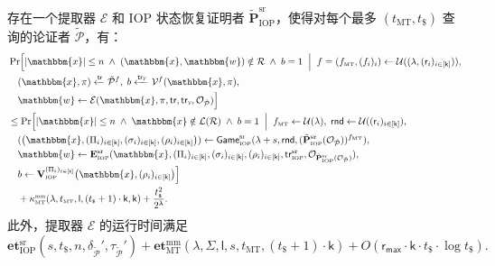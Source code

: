 \documentclass[american,singlepageview]{snargs-book-zh}
\newcommand{\Malicious}[1]{\tilde{#1}}
\newcommand{\BlackBox}[1]{\mathcal{O}_{#1}}
\newcommand{\DecisionBit}{b}
\newcommand{\SomeSize}[1]{|#1|}
\newcommand{\Relation}{\mathcal{R}}
\newcommand{\Language}{\mathcal{L}}
\newcommand{\GetLanguage}[1]{\Language(#1)}
\newcommand{\Instance}{\mathbbm{x}}
\newcommand{\Witness}{\mathbbm{w}}
\newcommand{\InstanceSize}{n}
\newcommand{\ProtoProver}{P}
\newcommand{\ProtoVerifier}{V}
\newcommand{\ProtoExtractor}{E}
\newcommand{\ProtoKnowledgeError}{\kappa}
\newcommand{\ProtoKnowledgeTime}{\mathbf{et}}
\newcommand{\ProtoAlphabet}{\Sigma}
\newcommand{\ProtoRoundComplexity}{\mathsf{k}}
\newcommand{\ProtoProofLength}{\mathsf{l}}
\newcommand{\ProtoRandomnessComplexity}{\mathsf{r}}
\newcommand{\RoundIndex}{i}
\newcommand{\SRSuperscript}{\mathrm{sr}}
\newcommand{\IOPSubscript}{\scriptscriptstyle\mathrm{IOP}}
\newcommand{\IOPFormat}[1]{\mathbf{#1}}
\newcommand{\IOPVerifier}{\IOPFormat{\ProtoVerifier}_{\IOPSubscript}}
\newcommand{\IOPExtractor}{\IOPFormat{\ProtoExtractor}_{\IOPSubscript}}
\newcommand{\IOPMaliciousProver}{\Malicious{\IOPFormat{\ProtoProver}}_{\IOPSubscript}}
\newcommand{\IOPString}{\Pi}
\newcommand{\IOPVerifierRandomMessage}{\rho}
\newcommand{\IOPRoundComplexity}{\ProtoRoundComplexity}
\newcommand{\IOPAlphabet}{\ProtoAlphabet}
\newcommand{\IOPProofLength}{\ProtoProofLength}
\newcommand{\IOPRandomnessComplexity}{\ProtoRandomnessComplexity}
\newcommand{\IOPMaxRandomnessComplexity}{\IOPRandomnessComplexity_{{\scriptscriptstyle\mathsf{max}}}}
\newcommand{\IOPStrings}{(\IOPString_{\RoundIndex})_{\RoundIndex \in [\IOPRoundComplexity]}}
\newcommand{\IOPVerifierRandomMessages}{(\IOPVerifierRandomMessage_{\RoundIndex})_{\RoundIndex \in [\IOPRoundComplexity]}}
\newcommand{\IOPTuple}[1]{(#1_{\RoundIndex})_{\RoundIndex \in [\IOPRoundComplexity]}}
\newcommand{\IOPVerifierInput}{\Instance,\IOPVerifierRandomMessages}
\newcommand{\IOPConvincingCondition}{\IOPVerifier^{\IOPStrings}\big(\IOPVerifierInput\big)}
\newcommand{\ARGFormat}[1]{\mathcal{#1}}
\newcommand{\ARGProver}{\ARGFormat{\ProtoProver}}
\newcommand{\ARGVerifier}{\ARGFormat{\ProtoVerifier}}
\newcommand{\ARGExtractor}{\ARGFormat{\ProtoExtractor}}
\newcommand{\ARGString}{\pi}
\newcommand{\ProverFailureProbability}[1]{\delta_{#1}}
\newcommand{\ProverRunningTime}[1]{\tau_{#1}}
\newcommand{\ROFunction}{f}
\newcommand{\ROQueryBound}{t}
\newcommand{\RODistribution}[1]{\mathcal{U}(#1)}
\newcommand{\SecurityParameter}{\lambda}
\newcommand{\PrivacyParameter}{s}
\newcommand{\ROTrace}{\mathsf{tr}}
\newcommand{\ROTraceVerifier}{\ROTrace_{\scalebox{0.5}{$\ARGVerifier$}}}
\newcommand{\ROTreeSymbol}{\MTSubscript}
\newcommand{\RORandSymbol}{\scriptscriptstyle \mathsf{\$}}
\newcommand{\ROTreeFunction}{\ROFunction_{\ROTreeSymbol}}
\newcommand{\RORandRoundFunction}[1]{\ROFunction_{#1}}
\newcommand{\ROTreeQueryBound}{\ROQueryBound_{\ROTreeSymbol}}
\newcommand{\RORandQueryBound}{\ROQueryBound_{\RORandSymbol}}
\newcommand{\MTSubscript}{{\scriptscriptstyle\mathrm{MT}}}
\newcommand{\MTMultiMultiSymbol}{\scriptscriptstyle{\mathrm{mm}}}
\newcommand{\MTMultiMultiExtractionError}{\ProtoKnowledgeError_{\MTSubscript}^{\MTMultiMultiSymbol}}
\newcommand{\MTMultiMultiExtractorTimeSymbol}{\ProtoKnowledgeTime_{\MTSubscript}^{\MTMultiMultiSymbol}}
\newcommand{\MTMultiMultiExtractorTimeFunction}[6]{\MTMultiMultiExtractorTimeSymbol(#1,#2,#3,#4,#5,#6)}
\newcommand{\RandSaltSize}{s}
\newcommand{\SRSaltString}{\sigma}
\newcommand{\SRSaltStrings}[1]{(\SRSaltString_{\RoundIndex})_{\RoundIndex \in [#1]}}
\newcommand{\SRRandomness}{\mathsf{rnd}}
\newcommand{\SRTrace}{\ROTrace^{\SRSuperscript}}
\newcommand{\SRGameName}[1]{\mathsf{Game}_{#1}^{\SRSuperscript}}
\newcommand{\IOPStateRestorationGame}[3]{\SRGameName{\IOPSubscript}(#1,#2,#3)}
\newcommand{\IOPSRKnowledgeTime}{\ProtoKnowledgeTime_{\IOPSubscript}^{\SRSuperscript}}
\newcommand{\IOPSRExtractor}{\IOPExtractor^{\SRSuperscript}}
\newcommand{\IOPMaliciousSRProver}{\IOPMaliciousProver^{\SRSuperscript}}
\newcommand{\IOPSROutput}{\big(\Instance,\IOPStrings,\SRSaltStrings{\IOPRoundComplexity},\IOPVerifierRandomMessages\big)}
\begin{document}
\begin{lemma}
\label{lemma:bcs-knolwdge-soundness-reduction}
存在一个提取器 $\ARGExtractor$ 和 IOP 状态恢复证明者 $\IOPMaliciousSRProver$，使得对每个最多 $(\ROTreeQueryBound,\RORandQueryBound)$ 查询的论证者 $\Malicious{\ARGProver}$，有：
\begin{align*}
&\Pr\Bigl[
  \SomeSize{\Instance}\le\InstanceSize
  \;\land\;(\Instance,\Witness)\notin\Relation
  \;\land\;\DecisionBit=1
  \;\Bigm|\;
  \ROFunction=(\ROTreeFunction,(\RORandRoundFunction{\RoundIndex})_{\RoundIndex})
    \gets\RODistribution{(\SecurityParameter,\IOPTuple{\IOPRandomnessComplexity})},\\
&\quad
  (\Instance,\ARGString)\xleftarrow{\ROTrace}\Malicious{\ARGProver}^{\ROFunction},\;
  \DecisionBit\xleftarrow{\ROTraceVerifier}\ARGVerifier^{\ROFunction}(\Instance,\ARGString),\\
&\quad
  \Witness\gets\ARGExtractor(\Instance,\ARGString,\ROTrace,\ROTraceVerifier,\BlackBox{\Malicious{\ARGProver}})
\Bigr] \\
&\le
\Pr\Bigl[
  \SomeSize{\Instance}\le\InstanceSize
  \;\land\;\Instance\notin\GetLanguage{\Relation}
  \;\land\;\DecisionBit=1
  \;\Bigm|\;
  \ROTreeFunction\gets\RODistribution{\SecurityParameter},\;
  \SRRandomness\gets\RODistribution{\IOPTuple{\IOPRandomnessComplexity}},\\
&\quad
  (\IOPSROutput)\gets\IOPStateRestorationGame{\SecurityParameter+\RandSaltSize}{\SRRandomness}
    {(\IOPMaliciousSRProver(\BlackBox{\Malicious{\ARGProver}}))^{\ROTreeFunction}},\\
&\quad
  \Witness\gets\IOPSRExtractor(\Instance,\IOPTuple{\IOPString},\IOPTuple{\SRSaltString},
    \IOPTuple{\IOPVerifierRandomMessage},\SRTrace_{\IOPSubscript},
    \BlackBox{\IOPMaliciousSRProver(\BlackBox{\Malicious{\ARGProver}})}),\\
&\quad
  \DecisionBit\gets\IOPConvincingCondition
\Bigr] \\
&\quad
+\MTMultiMultiExtractionError(\SecurityParameter,\ROTreeQueryBound,\IOPProofLength,
  (\RORandQueryBound+1)\cdot\IOPRoundComplexity,\IOPRoundComplexity)
+ \frac{\RORandQueryBound^2}{2^{\SecurityParameter}}.
\end{align*}
此外，提取器 $\ARGExtractor$ 的运行时间满足
\[
\IOPSRKnowledgeTime(\PrivacyParameter,\RORandQueryBound,\InstanceSize,
  \ProverFailureProbability{\Malicious{\ARGProver}}',
  \ProverRunningTime{\Malicious{\ARGProver}}')
+ \MTMultiMultiExtractorTimeFunction{\SecurityParameter}{\IOPAlphabet}{\IOPProofLength}
    {\PrivacyParameter}{\ROTreeQueryBound}{(\RORandQueryBound+1)\cdot\IOPRoundComplexity}
+ O(\IOPMaxRandomnessComplexity\cdot\IOPRoundComplexity\cdot\RORandQueryBound\cdot\log\RORandQueryBound).
\]
\end{lemma}
\end{document}

